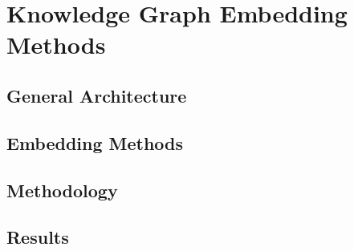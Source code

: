 \chapter{Knowledge Graph Embedding Methods}\label{ch:knowledge-graph-embedding-methods}

\section{General Architecture}

\section{Embedding Methods}\label{sec:embedding-methods}

\section{Methodology}

\section{Results}

